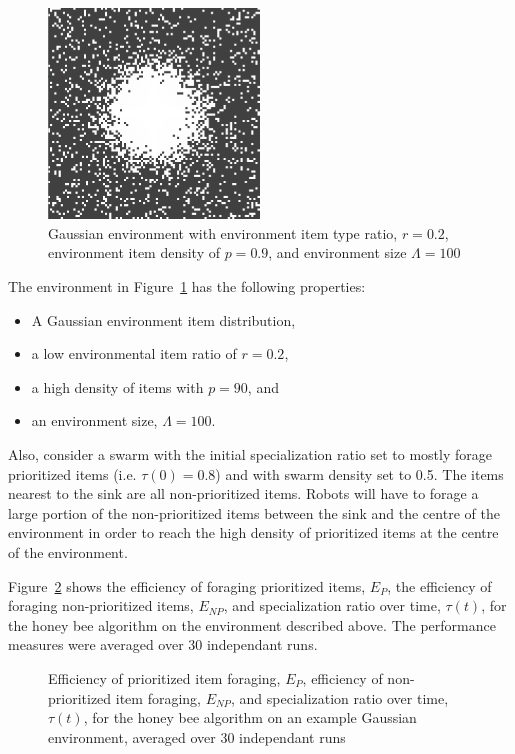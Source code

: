 \documentclass[preprint,12pt]{elsarticle}
\begin{document}
\begin{figure}
    \centering
    \includegraphics[width=0.5\textwidth]{figures/flexibility-gaussian-obj90-ratio.PNG}
    \caption{Gaussian environment with environment item type ratio, $r=0.2$, environment item density of $p=0.9$, and environment size $\Lambda=100$}
    \label{fig:gaussianhighdensityenv}
\end{figure}
    

The environment in Figure~\ref{fig:gaussianhighdensityenv} has the following properties:

\begin{itemize}
\item A Gaussian environment item distribution,
\item a low environmental item ratio of $r=0.2$,
\item a high density of items with $p=90$, and
\item an environment size, $\Lambda=100$.
\end{itemize}


Also, consider a swarm with the initial specialization ratio set to mostly forage prioritized items (i.e. $\tau(0)=0.8$) and with swarm density set to 0.5. The items nearest to the sink are all non-prioritized items. Robots will have to forage a large portion of the non-prioritized items between the sink and the centre of the environment in order to reach the high density of prioritized items at the centre of the environment. 


Figure~\ref{fig:gaussianhighdensityperformancehoneybee} shows the efficiency of foraging prioritized items, $E_P$, the efficiency of foraging non-prioritized items, $E_{NP}$, and specialization ratio over time, $\tau(t)$, for the honey bee algorithm on the environment described above. The performance measures were averaged over 30 independant runs.


\begin{figure}[htb]
\centering
\small
\resizebox{\textwidth}{!}{}
\caption{Efficiency of prioritized item foraging, $E_P$, efficiency of non-prioritized item foraging, $E_{NP}$, and specialization ratio over time, $\tau(t)$, for the honey bee algorithm on an example Gaussian environment, averaged over 30 independant runs}
\label{fig:gaussianhighdensityperformancehoneybee}
\end{figure}
\end{document}
